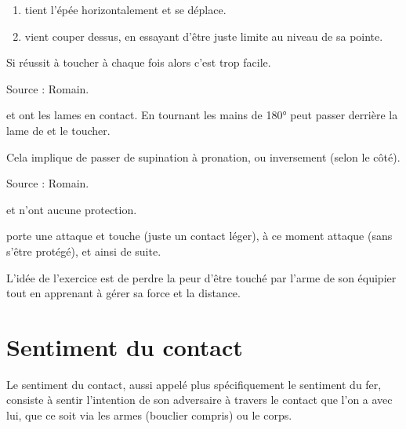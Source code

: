 \begin{exercice}

\begin{enumerate}
	\item \D tient l'épée horizontalement et se déplace.
	
	\item \A vient couper dessus, en essayant d'être juste limite au niveau de sa pointe.
\end{enumerate}

Si \A réussit à toucher à chaque fois alors c'est trop facile.

Source : Romain.

\end{exercice}


\begin{technique}
\label{struct:tech:changement-ligne}

\A et \D ont les lames en contact.
En tournant les mains de 180° \A peut passer derrière la lame de \D et le toucher.

Cela implique de passer de supination à pronation, ou inversement (selon le côté).

Source : Romain.
\end{technique}


\begin{exercice}
\A et \D n'ont aucune protection.

\A porte une attaque et touche \D (juste un contact léger), à ce moment \D attaque \A (sans s'être protégé), et ainsi de suite.

L'idée de l'exercice est de perdre la peur d'être touché par l'arme de son équipier tout en apprenant à gérer sa force et la distance.
\end{exercice}


\section{Sentiment du contact}


Le sentiment du contact, aussi appelé plus spécifiquement le sentiment du fer, consiste à sentir l'intention de son adversaire à travers le contact que l'on a avec lui, que ce soit via les armes (bouclier compris) ou le corps.


